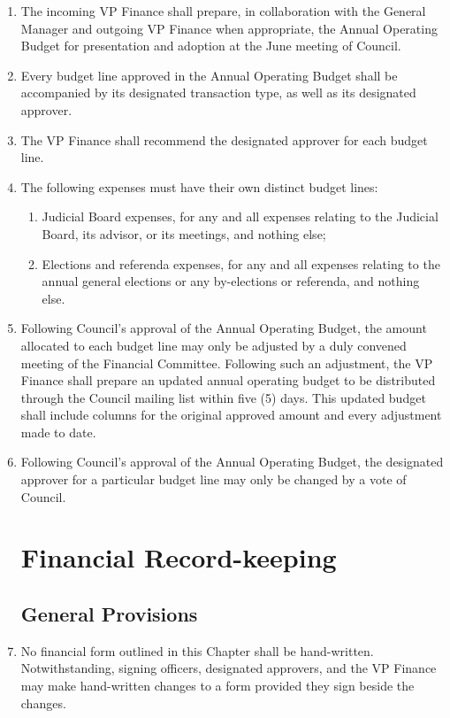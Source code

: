 \documentclass[oneside]{book}
\begin{document}
\begin{enumerate}
\item The incoming VP Finance shall prepare, in collaboration with the General Manager and outgoing VP Finance when appropriate, the Annual Operating Budget for presentation and adoption at the June meeting of Council.
\item Every budget line approved in the Annual Operating Budget shall be accompanied by its designated transaction type, as well as its designated approver.
\item The VP Finance shall recommend the designated approver for each budget line.
\item The following expenses must have their own distinct budget lines:
	\begin{enumerate}
	\item Judicial Board expenses, for any and all expenses relating to the Judicial Board, its advisor, or its meetings, and nothing else;
	\item Elections and referenda expenses, for any and all expenses relating to the annual general elections or any by-elections or referenda, and nothing else.
	\end{enumerate}
\item \label{changing_budget_lines} Following Council’s approval of the Annual Operating Budget, the amount allocated to each budget line may only be adjusted by a duly convened meeting of the Financial Committee. Following such an adjustment, the VP Finance shall prepare an updated annual operating budget to be distributed through the Council mailing list within five (5) days. This updated budget shall include columns for the original approved amount and every adjustment made to date.
\item Following Council’s approval of the Annual Operating Budget, the designated approver for a particular budget line may only be changed by a vote of Council.

\chapter{\label{Financial_Record-keeping}Financial Record-keeping}
\section{\label{Record_keeping_general_provisions}General Provisions}

\item No financial form outlined in this Chapter shall be hand-written. Notwithstanding, signing officers, designated approvers, and the VP Finance may make hand-written changes to a form provided they sign beside the changes. 


\end{enumerate}
\end{document}
